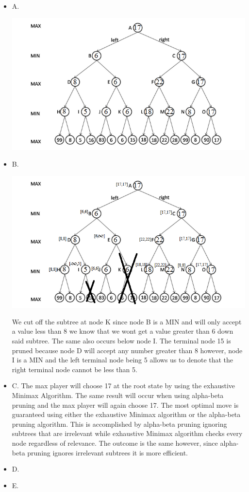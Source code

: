 \documentclass[10pt,a4paper]{article}
\begin{document}
	\begin{itemize}
		\item
		A. 
		\begin{center}
			\includegraphics[scale=0.5]{Minimax}
		\end{center}
		\item
		B. 
		\begin{center}
			\includegraphics[scale=0.5]{Pruning}
		\end{center}
		
		We cut off the subtree at node K since node B is a MIN and will only accept a value less than 8 we know that we wont get a value greater than 6 down said subtree. The same also occurs below node I. The terminal node 15 is pruned because node D will accept any number greater than 8 however, node I is a MIN and the left terminal node being 5 allows us to denote that the right terminal node cannot be less than 5.
		
		\item 
		C. The max player will choose 17 at the root state by using the exhaustive Minimax Algorithm. The same result will occur when using alpha-beta pruning
		and the max player will again choose 17. The most optimal move is guaranteed using either the exhaustive Minimax algorithm or the alpha-beta pruning algorithm. This is accomplished by alpha-beta pruning ignoring subtrees that are irrelevant while exhaustive Minimax algorithm checks every node regardless of relevance. The outcome is the same however, since alpha-beta pruning ignores irrelevant subtrees it is more efficient.
		
		\item
		D. 
		
		\item
		E. 
	\end{itemize}
	\clearpage
\end{document}
